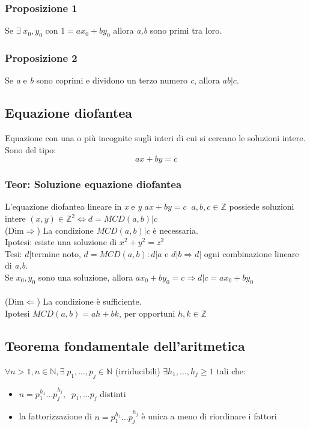\subsubsection{Proposizione 1}
Se \(\exists\; x_0,y_0\) con \(1=ax_0+by_0\) allora \textit{a,b} sono primi tra loro.

\subsubsection{Proposizione 2}
Se \textit{a} e \textit{b} sono coprimi e dividono un terzo numero \textit{c}, allora \(ab|c\).

\subsection{Equazione diofantea}
Equazione con una o più incognite sugli interi di cui si cercano le soluzioni intere. Sono del tipo:
\[ax+by=c\]

\subsubsection{Teor: Soluzione equazione diofantea}
L'equazione diofantea lineare in \textit{x} e \textit{y} \(ax+by=c\;\; a,b,c\in\mathbb{Z}\) possiede soluzioni intere \((x,y)\in\mathbb{Z}^2\Leftrightarrow d=MCD(a,b)|c\)
\\
(Dim\(\Rightarrow\)) La condizione \(MCD(a,b)|c\) è necessaria.
\\
Ipotesi: esiste una soluzione di \(x^2+y^2=z^2\)
\\
Tesi: \(d|\)termine noto, \(d=MCD(a,b): d|a\) e \(d|b\Rightarrow d|\) ogni combinazione lineare di \textit{a,b}.
\\
Se \(x_0,y_0\) sono una soluzione, allora \(ax_0+by_0=c\Rightarrow d|c=ax_0+by_0\)
\\\\
(Dim\(\Leftarrow\)) La condizione è sufficiente.
\\
Ipotesi \(MCD(a,b)=ah+bk\), per opportuni \(h,k\in\mathbb{Z}\)

\subsection{Teorema fondamentale dell'aritmetica}
\(\forall n>1, n\in\mathbb{N},\exists\;p_1,...,p_j\in\mathbb{N}\) (irriducibili) \(\exists h_1,...,h_j\geq 1\) tali che:
\begin{itemize}
    \item \(n=p_1^{h_1}...p_j^{h_j},\;\;p_1,...p_j\) distinti
    \item la fattorizzazione di \(n=p_1^{h_1}...p_j^{h_j}\) è unica a meno di riordinare i fattori
\end{itemize}

